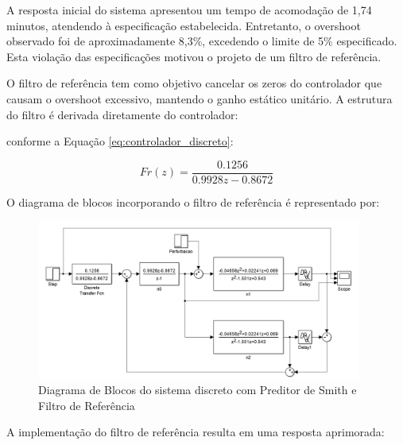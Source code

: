 \documentclass[a4paper,12pt]{article}
\begin{document}
A resposta inicial do sistema apresentou um tempo de acomodação de 1,74 minutos, atendendo à especificação estabelecida. Entretanto, o overshoot observado foi de aproximadamente 8,3\%, excedendo o limite de 5\% especificado. Esta violação das especificações motivou o projeto de um filtro de referência.

O filtro de referência tem como objetivo cancelar os zeros do controlador que causam o overshoot excessivo, mantendo o ganho estático unitário. A estrutura do filtro é derivada diretamente do controlador:

  conforme a Equação \ref{eq:controlador_discreto}:

\begin{equation}
Fr(z) = \frac{0.1256}{0.9928z-0.8672}
\label{eq:filtro_referencia}
\end{equation}

  O diagrama de blocos incorporando o filtro de referência é representado por:

 \begin{figure}[H]
  \centering
  \includegraphics[width=0.95\textwidth]{Imagens/q11p.png}
  \caption{Diagrama de Blocos do sistema discreto com Preditor de Smith e Filtro de Referência}
  \end{figure}

A implementação do filtro de referência resulta em uma resposta aprimorada:
\end{document}
